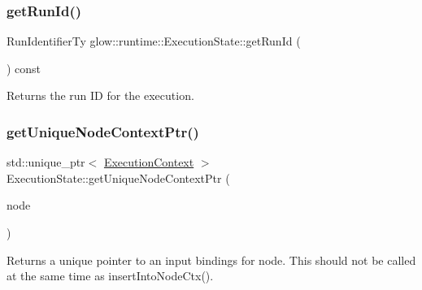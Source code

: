 \subsubsection{\texorpdfstring{get\+Run\+Id()}{getRunId()}}
{\footnotesize\ttfamily Run\+Identifier\+Ty glow\+::runtime\+::\+Execution\+State\+::get\+Run\+Id (\begin{DoxyParamCaption}{ }\end{DoxyParamCaption}) const\hspace{0.3cm}{\ttfamily [inline]}}

\begin{DoxyReturn}{Returns}
the run ID for the execution. 
\end{DoxyReturn}
\mbox{\label{classglow_1_1runtime_1_1_execution_state_a472587e5d655a0cba62586bcc4cefc61}} 
\subsubsection{\texorpdfstring{get\+Unique\+Node\+Context\+Ptr()}{getUniqueNodeContextPtr()}}
{\footnotesize\ttfamily std\+::unique\+\_\+ptr$<$ \hyperlink{classglow_1_1_execution_context}{Execution\+Context} $>$ Execution\+State\+::get\+Unique\+Node\+Context\+Ptr (\begin{DoxyParamCaption}\item[{const \hyperlink{structglow_1_1runtime_1_1_d_a_g_node}{D\+A\+G\+Node} $\ast$}]{node }\end{DoxyParamCaption})}

\begin{DoxyReturn}{Returns}
a unique pointer to an input bindings for {\ttfamily node}. This should not be called at the same time as insert\+Into\+Node\+Ctx(). 
\end{DoxyReturn}
\mbox{\label{classglow_1_1runtime_1_1_execution_state_afb39fb7b89ae3fe9ad5f869349c5f130}} 
